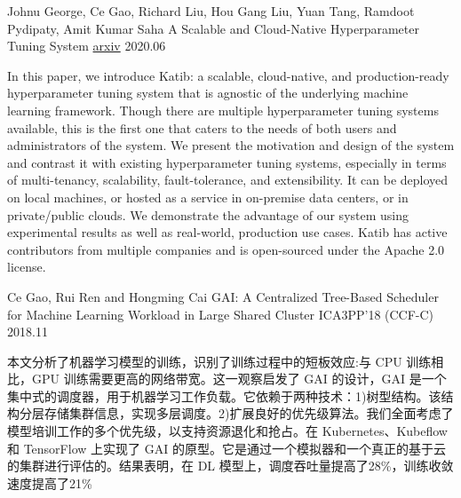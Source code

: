 
\begin{cventries}

  \cventry
    {Johnu George, Ce Gao, Richard Liu, Hou Gang Liu, Yuan Tang, Ramdoot Pydipaty, Amit Kumar Saha} %
    {A Scalable and Cloud-Native Hyperparameter Tuning System} %
    {\href{https://arxiv.org/abs/2006.02085}{arxiv}} %
    {2020.06} %
    {
      \begin{cvitems} %
        \item {
          In this paper, we introduce Katib: a scalable, cloud-native, and production-ready hyperparameter tuning system that is agnostic of the underlying machine learning framework. Though there are multiple hyperparameter tuning systems available, this is the first one that caters to the needs of both users and administrators of the system. We present the motivation and design of the system and contrast it with existing hyperparameter tuning systems, especially in terms of multi-tenancy, scalability, fault-tolerance, and extensibility. It can be deployed on local machines, or hosted as a service in on-premise data centers, or in private/public clouds. We demonstrate the advantage of our system using experimental results as well as real-world, production use cases. Katib has active contributors from multiple companies and is open-sourced under the Apache 2.0 license.
        }
      \end{cvitems}
    }

  \cventry
    {Ce Gao, Rui Ren and Hongming Cai} %
    {GAI: A Centralized Tree-Based Scheduler for Machine Learning Workload in Large Shared Cluster} %
    {ICA3PP'18 (CCF-C)} %
    {2018.11} %
    {
      \begin{cvitems} %
        \item {
          本文分析了机器学习模型的训练，识别了训练过程中的短板效应:与 CPU 训练相比，GPU 训练需要更高的网络带宽。这一观察启发了 GAI 的设计，GAI 是一个集中式的调度器，用于机器学习工作负载。它依赖于两种技术：1)树型结构。该结构分层存储集群信息，实现多层调度。2)扩展良好的优先级算法。我们全面考虑了模型培训工作的多个优先级，以支持资源退化和抢占。在 Kubernetes、Kubeflow 和 TensorFlow 上实现了 GAI 的原型。它是通过一个模拟器和一个真正的基于云的集群进行评估的。结果表明，在 DL 模型上，调度吞吐量提高了28\%，训练收敛速度提高了21\%
        }
      \end{cvitems}
    }


\end{cventries}
